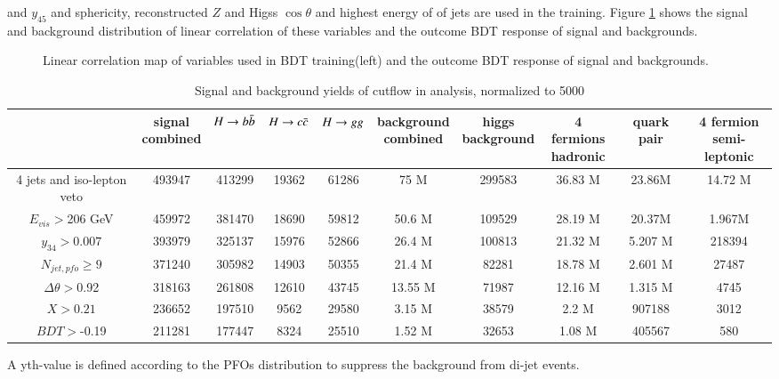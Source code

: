 and $y_{45}$ and sphericity, reconstructed $Z$ and Higss $\cos \theta$ and highest energy of 
of jets are used in the training. Figure \ref{fig:qqh_BDT} shows the signal and background distribution of linear correlation of these variables and the outcome BDT response of signal and backgrounds.
\begin{figure}
\label{fig:qqh_BDT}
\centering
{}
\caption{Linear correlation map of variables used in BDT training(left) and the outcome BDT 
response of signal and backgrounds.}
\end{figure}


\begin{table}[!htpb]
\centering
\chuhao
\begin{tabular}{c|c|c|c|c|c|c|c|c|c}\hline
         & \tabincell{c}{signal \\ combined}   &  $H \rightarrow b\bar{b}$   & $H\rightarrow c\bar{c}$   & $H\rightarrow gg$   & \tabincell{c}{background\\ combined} & \tabincell{c}{higgs \\background}   &   \tabincell{c}{4 fermions\\ hadronic}&  quark pair &  \tabincell{c}{4 fermion\\ semi-leptonic}  \\ \hline 
 4 jets and iso-lepton veto 
         &  493947 & 413299   & 19362  & 61286  &     75 M      &  299583  &  36.83 M &   23.86M   &   14.72 M      \\ \hline
  $E_{vis} > $206 GeV
         &  459972 &  381470  & 18690  & 59812  &     50.6 M    &  109529  &  28.19 M  &  20.37M  &  1.967M  \\ \hline
 $y_{34} > 0.007$
         &  393979 &  325137 &   15976  & 52866 & 26.4 M        &   100813 &  21.32 M  &  5.207 M  &  218394 \\ \hline
 $N_{jet,pfo} \ge 9$
         &  371240 &  305982 &   14903  & 50355 & 21.4 M        &    82281 &  18.78 M  & 
2.601 M  &  27487  \\ \hline
 $\Delta \theta > $0.92
         &  318163 &  261808 &   12610  & 43745 & 13.55 M       &    71987 &  12.16 M &  
1.315 M  &  4745   \\ \hline
   $X > 0.21$
         &  236652 &  197510 &    9562  & 29580 & 3.15 M        &    38579 &  2.2 M   &  907188   &  3012   \\ \hline
   $BDT > $-0.19
         &  211281 &  177447 &    8324  & 25510 & 1.52 M        &    32653 &  1.08 M  & 
405567   &  580    \\ \hline   
      
\end{tabular}
\caption{Signal and background yields of cutflow in \qqh analysis, normalized to 5000 \ifb}
\label{tab:cut_qqh}
\end{table}


A yth-value is defined according to the PFOs distribution to suppress the background from di-jet events. 